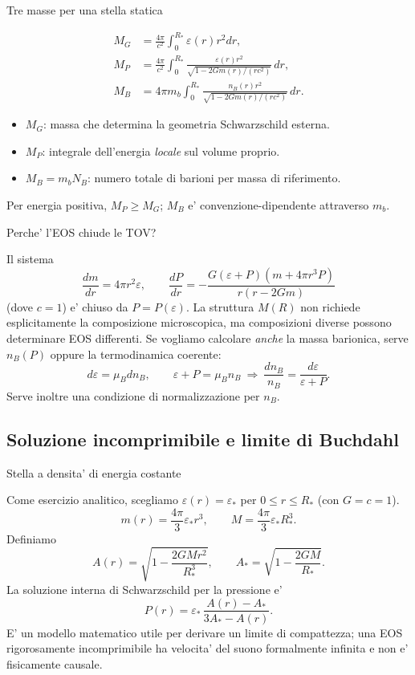 \begin{frame}[t]{Tre masse per una stella statica}\small\raggedright

\[
\begin{aligned}
M_G&=\frac{4\pi}{c^2}\int_0^{R_*}\varepsilon(r)r^2dr,\\
M_P&=\frac{4\pi}{c^2}\int_0^{R_*}
\frac{\varepsilon(r)r^2}{\sqrt{1-2Gm(r)/(rc^2)}}\,dr,\\
M_B&=4\pi m_b\int_0^{R_*}
\frac{n_B(r)r^2}{\sqrt{1-2Gm(r)/(rc^2)}}\,dr.
\end{aligned}
\]
\begin{itemize}
\item $M_G$: massa che determina la geometria Schwarzschild esterna.
\item $M_P$: integrale dell'energia \emph{locale} sul volume proprio.
\item $M_B=m_bN_B$: numero totale di barioni per massa di riferimento.
\end{itemize}
Per energia positiva, $M_P\geq M_G$; $M_B$ e' convenzione-dipendente attraverso $m_b$.

\end{frame}

\begin{frame}[t]{Perche' l'EOS chiude le TOV?}\small\raggedright

Il sistema
\[
\frac{dm}{dr}=4\pi r^2\varepsilon,\qquad
\frac{dP}{dr}=-\frac{G(\varepsilon+P)(m+4\pi r^3P)}{r(r-2Gm)}
\]
(dove $c=1$) e' chiuso da $P=P(\varepsilon)$.
\medskip
La struttura $M(R)$ non richiede esplicitamente la composizione microscopica, ma composizioni diverse possono determinare EOS differenti.
\medskip
Se vogliamo calcolare \emph{anche} la massa barionica, serve $n_B(P)$ oppure la termodinamica coerente:
\[
d\varepsilon=\mu_Bdn_B,\qquad \varepsilon+P=\mu_Bn_B
\ \Longrightarrow\ \frac{dn_B}{n_B}=\frac{d\varepsilon}{\varepsilon+P}.
\]
Serve inoltre una condizione di normalizzazione per $n_B$.

\end{frame}

\subsection{Soluzione incomprimibile e limite di Buchdahl}

\begin{frame}[t]{Stella a densita' di energia costante}\small\raggedright

Come esercizio analitico, scegliamo $\varepsilon(r)=\varepsilon_*$ per $0\leq r\leq R_*$ (con $G=c=1$).
\[
m(r)=\frac{4\pi}{3}\varepsilon_*r^3,
\qquad
M=\frac{4\pi}{3}\varepsilon_*R_*^3.
\]
Definiamo
\[
A(r)=\sqrt{1-\frac{2GM r^2}{R_*^3}},\qquad
A_*=\sqrt{1-\frac{2GM}{R_*}}.
\]
La soluzione interna di Schwarzschild per la pressione e'
\[
\boxed{P(r)=\varepsilon_*\,
\frac{A(r)-A_*}{3A_*-A(r)}.}
\]
E' un modello matematico utile per derivare un limite di compattezza; una EOS rigorosamente incomprimibile ha velocita' del suono formalmente infinita e non e' fisicamente causale.

\end{frame}

